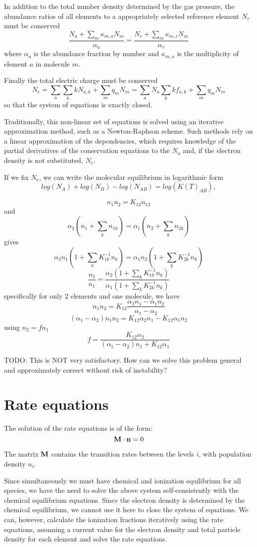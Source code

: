 \documentclass[a4paper]{article}
\begin{document}
In addition to the total number density determined by the gas pressure, the abundance 
ratios of all elements to a appropriately selected reference element $N_r$ must be conserved
$$
\frac{N_a + \sum_m \kappa_{m,a} N_{m}}{\alpha_a}=\frac{N_r + \sum_m \kappa_{m,r} N_{m}}{\alpha_r}
$$
where $\alpha_a$ is the abundance fraction by number and $\kappa_{m,a}$ is the multiplicity of element 
$a$ in molecule $m$.

Finally the total electric charge must be conserved
$$
N_e=\sum_a \sum_k k N_{a,k} + \sum_m q_m N_{m}=\sum_a  N_a\sum_k k f_{a,k} + \sum_m q_m N_{m}
$$
so that the system of equations is exactly closed.

Traditionally, this non-linear set of equations is solved using an iterative approximation method, such as 
a Newton-Raphson scheme. Such methods rely on a linear approximation of the dependencies, which requires 
knowledge of the partial derivatives of the conservation equations to the $N_a$ and, if the electron 
density is not substituted, $N_e$.

If we fix $N_e$, we can write the molecular equilibrium in logarithmic form
$$
log(N_A)+log(N_B)-log(N_{AB})=log(K(T)_{AB}),
$$

$$
n_1 n_2 = K_{12} n_{12}
$$
and
$$
\alpha_2 (n_1 + \sum_k n_{1k}) = \alpha_1(n_2 + \sum_k n_{2k})
$$
gives 
$$
\alpha_2 n_1 (1 + \sum_k K_{1k}^{-1} n_k) = \alpha_1 n_2(1 + \sum_k K_{2k}^{-1} n_k)
$$
$$
\frac{n_2}{n_1}=\frac{\alpha_2 (1 + \sum_k K_{1k}^{-1} n_k)}{\alpha_1(1 + \sum_k K_{2k}^{-1} n_k)}
$$
specifically for only 2 elements and one molecule, we have 
$$
n_1 n_2 =K_{12} \frac{\alpha_2 n_1 - \alpha_1 n_2}{\alpha_1-\alpha_2}
$$
$$
(\alpha_1-\alpha_2) n_1 n_2 = K_{12} \alpha_2  n_1 - K_{12} \alpha_1 n_2
$$
using $n_2=f n_1$
$$
f = \frac{K_{12} \alpha_2}{(\alpha_1-\alpha_2) n_1 + K_{12} \alpha_1}
$$

TODO: This is NOT very satisfactory. How can we solve this problem general and approximately correct without risk of instability?

\section{Rate equations}
The solution of the rate equations is of the form:
$$
{\bf M} \cdot {\bf n} = 0
$$

The matrix ${\bf M}$ contains the transition rates between the levels $i$, with population density $n_i$.

Since simultaneously we must have chemical and ionization equilibrium for all species, we have the need to solve the above system self-consistently with the chemical equilibrium equations. Since the electron density is determined by the chemical equilibrium, we cannot use it here to close the system of equations. We can, however, calculate the ionization fractions iteratively using the rate equations, assuming a current value for the electron density and total particle density for each element and solve the rate equations. 
\end{document}
